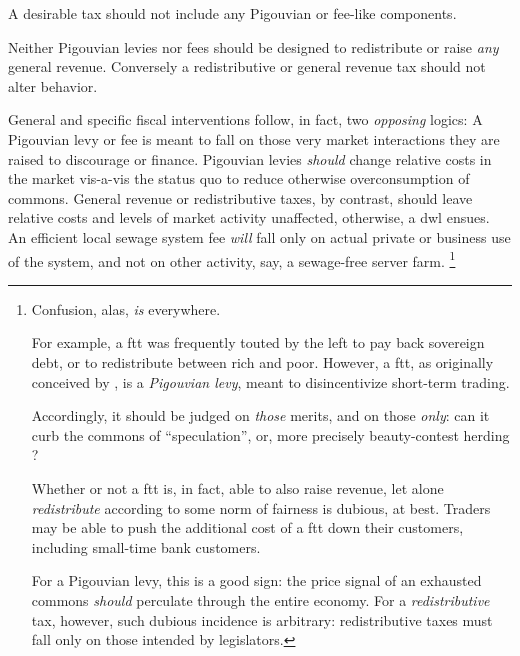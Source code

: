 
\begin{desideratum}
	\label{des:ordoliberal-hygiene}
	A desirable tax should not include any Pigouvian or fee-like components.
\end{desideratum}


Neither Pigouvian levies nor fees should be designed to redistribute or raise \emph{any} general revenue.
%
Conversely a redistributive or general revenue tax should not alter behavior.

General and specific fiscal interventions follow, in fact, two \emph{opposing} logics:
A Pigouvian levy or fee is meant to fall on those very market interactions they are raised to discourage or finance.
Pigouvian levies \emph{should} change relative costs in the market vis-a-vis the status quo to reduce otherwise overconsumption of commons.
General revenue or redistributive taxes, by contrast, should leave relative costs and levels of market activity unaffected, otherwise, a \gls{dwl} ensues.
An efficient local sewage system fee \emph{will} fall only on actual private or business use of the system, and not on other activity, say, a sewage-free server farm.
\footnote{
	Confusion, alas, \emph{is} everywhere.

	For example, a \gls{ftt} was frequently touted by the left to pay back sovereign debt, or to redistribute between rich and poor.
	However, a \gls{ftt}, as originally conceived by \cite{Tobin1970}, is a \emph{Pigouvian levy}, meant to disincentivize short-term trading.

	Accordingly, it should be judged on \emph{those} merits, and on those \emph{only}:
	can it curb the commons of ``speculation'', or, more precisely beauty-contest \citep{Keynes1936} herding \citep{Banerjee-1992-aa}?

	Whether or not a \gls{ftt} is, in fact, able to also raise revenue, let alone \emph{redistribute} according to some norm of fairness is dubious, at best.
	Traders may be able to push the additional cost of a \gls{ftt} down their customers, including small-time bank customers.

	For a Pigouvian levy, this is a good sign:
	the price signal of an exhausted commons \emph{should} perculate through the entire economy.
	For a \emph{redistributive} tax, however, such dubious incidence is arbitrary:
	redistributive taxes must fall only on those intended by legislators.
}

